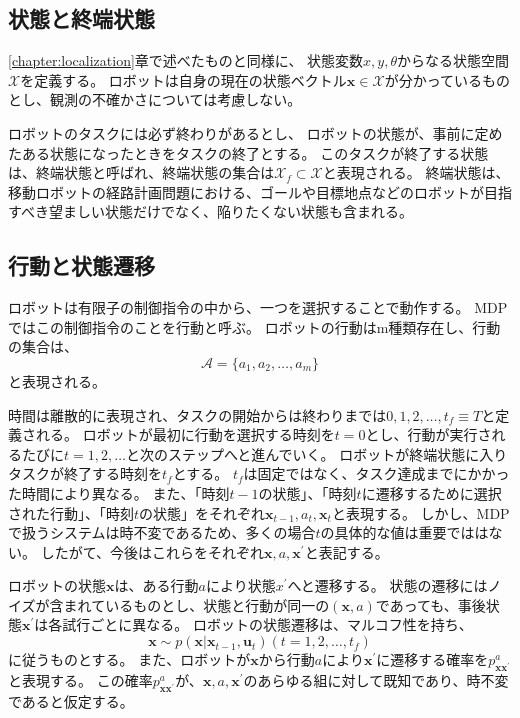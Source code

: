 \subsection{状態と終端状態}
\ref{chapter:localization}章で述べたものと同様に、
状態変数$x,y,\theta$からなる状態空間$\mathcal{X}$を定義する。
ロボットは自身の現在の状態ベクトル$\bm{x} \in \mathcal{X}$が分かっているものとし、観測の不確かさについては考慮しない。

ロボットのタスクには必ず終わりがあるとし、
ロボットの状態が、事前に定めたある状態になったときをタスクの終了とする。
このタスクが終了する状態は、終端状態と呼ばれ、終端状態の集合は$\mathcal{X}_f \subset \mathcal{X}$と表現される。
終端状態は、移動ロボットの経路計画問題における、ゴールや目標地点などのロボットが目指すべき望ましい状態だけでなく、陥りたくない状態も含まれる。

\subsection{行動と状態遷移}
ロボットは有限子の制御指令の中から、一つを選択することで動作する。
MDPではこの制御指令のことを行動と呼ぶ。
ロボットの行動はm種類存在し、行動の集合は、
\begin{equation}
\label{action}
  \mathcal{A} = \{ a_{1}, a_{2}, \ldots , a_{m} \}
\end{equation}
と表現される。

時間は離散的に表現され、タスクの開始からは終わりまでは${0,1,2,\ldots,t_{f}} \equiv T$と定義される。
ロボットが最初に行動を選択する時刻を$t=0$とし、行動が実行されるたびに$t=1,2,\ldots$と次のステップへと進んでいく。
ロボットが終端状態に入りタスクが終了する時刻を$t_{f}$とする。
$t_{f}$は固定ではなく、タスク達成までにかかった時間により異なる。
また、「時刻$t-1$の状態」、「時刻$t$に遷移するために選択された行動」、「時刻$t$の状態」をそれぞれ$\bm{x}_{t-1}, a_{t}, \bm{x}_{t}$と表現する。
しかし、MDPで扱うシステムは時不変であるため、多くの場合$t$の具体的な値は重要でははない。
したがて、今後はこれらをそれぞれ$\bm{x}, a, \bm{x}^{'}$と表記する。

ロボットの状態$\bm{x}$は、ある行動$a$により状態$x^{'}$へと遷移する。
状態の遷移にはノイズが含まれているものとし、状態と行動が同一の$(\bm{x}, a)$であっても、事後状態$\bm{x}^{'}$は各試行ごとに異なる。
ロボットの状態遷移は、マルコフ性を持ち、
\begin{equation}
\label{trans prob}
  \bm{x} \sim p(\bm{x} | \bm{x}_{t-1}, \bm{u}_t) (t=1,2,\ldots,t_{f})
\end{equation}
に従うものとする。
また、ロボットが$\bm{x}$から行動$a$により$\bm{x}^{'}$に遷移する確率を$p^{a}_{\bm{x}\bm{x}^{'}}$と表現する。
この確率$p^{a}_{\bm{x}\bm{x}^{'}}$が、$\bm{x}, a, \bm{x}^{'}$のあらゆる組に対して既知であり、時不変であると仮定する。

